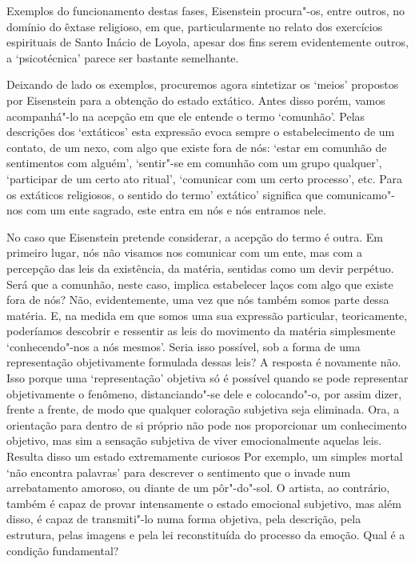 Exemplos do funcionamento destas fases, Eisenstein procura"-os, entre
outros, no domínio do êxtase religioso, em que, particularmente no
relato dos exercícios espirituais de Santo Inácio de Loyola, apesar dos
fins serem evidentemente outros, a `psicotécnica' parece ser bastante
semelhante.

Deixando de lado os exemplos, procuremos agora sintetizar os `meios'
propostos por Eisenstein para a obtenção do estado extático. Antes disso
porém, vamos acompanhá"-lo na acepção em que ele entende o termo
`comunhão'. Pelas descrições dos `extáticos' esta expressão evoca sempre
o estabelecimento de um contato, de um nexo, com algo que existe fora de
nós: `estar em comunhão de sentimentos com alguém', `sentir"-se em
comunhão com um grupo qualquer', `participar de um certo ato ritual',
`comunicar com um certo processo', etc. Para os extáticos religiosos, o
sentido do termo' extático' significa que comunicamo"-nos com um ente
sagrado, este entra em nós e nós entramos nele.

No caso que Eisenstein pretende considerar, a acepção do termo é outra.
Em primeiro lugar, nós não visamos nos comunicar com um ente, mas com a
percepção das leis da existência, da matéria, sentidas como um devir
perpétuo. Será que a comunhão, neste caso, implica estabelecer laços com
algo que existe fora de nós? Não, evidentemente, uma vez que nós também
somos parte dessa matéria. E, na medida em que somos uma sua expressão
particular, teoricamente, poderíamos descobrir e ressentir as leis do
movimento da matéria simplesmente `conhecendo"-nos a nós mesmos'. Seria
isso possível, sob a forma de uma representação objetivamente formulada
dessas leis? A resposta é novamente não. Isso porque uma `representação'
objetiva só é possível quando se pode representar objetivamente o
fenômeno, distanciando"-se dele e colocando"-o, por assim dizer, frente a
frente, de modo que qualquer coloração subjetiva seja eliminada. Ora, a
orientação para dentro de si próprio não pode nos proporcionar um
conhecimento objetivo, mas sim a sensação subjetiva de viver
emocionalmente aquelas leis. Resulta disso um estado extremamente
curiosos Por exemplo, um simples mortal `não encontra palavras' para
descrever o sentimento que o invade num arrebatamento amoroso, ou diante
de um pôr"-do"-sol. O artista, ao contrário, também é capaz de provar
intensamente o estado emocional subjetivo, mas além disso, é capaz de
transmiti"-lo numa forma objetiva, pela descrição, pela estrutura, pelas
imagens e pela lei reconstituída do processo da emoção. Qual é a
condição fundamental?

